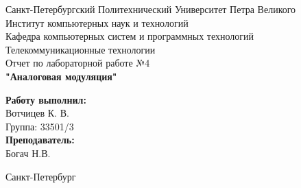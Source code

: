 \documentclass[a4paper]{article}
\begin{document}

\begin{titlepage}	%

	\begin{center}		%

		\large Санкт-Петербургский Политехнический Университет Петра Великого\\
		\large Институт компьютерных наук и технологий \\
		\large Кафедра компьютерных систем и программных технологий\\[6cm]
		
		\huge Телекоммуникационные технологии\\[0.5cm] %
		\large Отчет по лабораторной работе №4 \\[0.2cm]
		\large\textbf{"Аналоговая модуляция"}\\[5cm]

	\end{center}


	\begin{flushright} %
		\begin{minipage}{0.25\textwidth} %
			\begin{flushleft} %

				\large\textbf{Работу выполнил:}\\
				\large Вотчицев К. В.\\
				\large {Группа:} 33501/3\\
				
				\large \textbf{Преподаватель:}\\
				\large Богач Н.В.\

			\end{flushleft}
		\end{minipage}
	\end{flushright}
	
	\vfill %

	\begin{center}
	\large Санкт-Петербург\\
	\large \the\year %
	\end{center} %

\thispagestyle{empty} %
\end{titlepage} %
\end{document}
